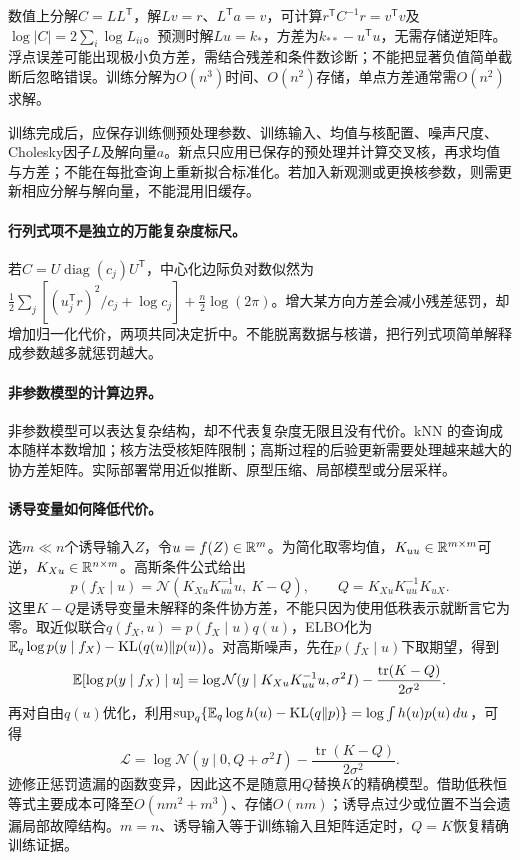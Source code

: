 数值上分解$C=LL^{\mathsf T}$，解$Lv=r$、$L^{\mathsf T}a=v$，可计算$r^{\mathsf T}C^{-1}r=v^{\mathsf T}v$及$\log|C|=2\sum_i\log L_{ii}$。预测时解$Lu=k_*$，方差为$k_{**}-u^{\mathsf T}u$，无需存储逆矩阵。浮点误差可能出现极小负方差，需结合残差和条件数诊断；不能把显著负值简单截断后忽略错误。训练分解为$O(n^3)$时间、$O(n^2)$存储，单点方差通常需$O(n^2)$求解。

训练完成后，应保存训练侧预处理参数、训练输入、均值与核配置、噪声尺度、Cholesky因子$L$及解向量$a$。新点只应用已保存的预处理并计算交叉核，再求均值与方差；不能在每批查询上重新拟合标准化。若加入新观测或更换核参数，则需更新相应分解与解向量，不能混用旧缓存。

\paragraph{行列式项不是独立的万能复杂度标尺。}
若$C=U\operatorname{diag}(c_j)U^{\mathsf T}$，中心化边际负对数似然为$\frac12\sum_j[(u_j^{\mathsf T}r)^2/c_j+\log c_j]+\frac n2\log(2\pi)$。增大某方向方差会减小残差惩罚，却增加归一化代价，两项共同决定折中。不能脱离数据与核谱，把行列式项简单解释成参数越多就惩罚越大。

\paragraph{非参数模型的计算边界。}
非参数模型可以表达复杂结构，却不代表复杂度无限且没有代价。kNN 的查询成本随样本数增加；核方法受核矩阵限制；高斯过程的后验更新需要处理越来越大的协方差矩阵。实际部署常用近似推断、原型压缩、局部模型或分层采样。

\paragraph{诱导变量如何降低代价。}
选$m\ll n$个诱导输入$Z$，令$u=f(Z)\in\mathbb{R}^m$。为简化取零均值，$K_{uu}\in\mathbb{R}^{m\times m}$可逆，$K_{Xu}\in\mathbb{R}^{n\times m}$。高斯条件公式给出
\begin{equation}
 p(f_X\mid u)=\mathcal N(K_{Xu}K_{uu}^{-1}u,\ K-Q),\qquad
 Q=K_{Xu}K_{uu}^{-1}K_{uX}.
\end{equation}
这里$K-Q$是诱导变量未解释的条件协方差，不能只因为使用低秩表示就断言它为零。取近似联合$q(f_X,u)=p(f_X\mid u)q(u)$，ELBO化为$\mathbb{E}_q\log p(y\mid f_X)-\operatorname{KL}(q(u)\|p(u))$。对高斯噪声，先在$p(f_X\mid u)$下取期望，得到
\begin{equation}
 \mathbb{E}[\log p(y\mid f_X)\mid u]
 =\log\mathcal N(y\mid K_{Xu}K_{uu}^{-1}u,\sigma^2I)
 -\frac{\operatorname{tr}(K-Q)}{2\sigma^2}.
\end{equation}
再对自由$q(u)$优化，利用$\sup_q\{\mathbb{E}_q\log h(u)-\operatorname{KL}(q\|p)\}=\log\int h(u)p(u)\,du$，可得
\begin{equation}
 \mathcal L=\log\mathcal N(y\mid0,Q+\sigma^2I)
 -\frac{\operatorname{tr}(K-Q)}{2\sigma^2}.
\end{equation}
迹修正惩罚遗漏的函数变异，因此这不是随意用$Q$替换$K$的精确模型。借助低秩恒等式主要成本可降至$O(nm^2+m^3)$、存储$O(nm)$；诱导点过少或位置不当会遗漏局部故障结构。$m=n$、诱导输入等于训练输入且矩阵适定时，$Q=K$恢复精确训练证据。

